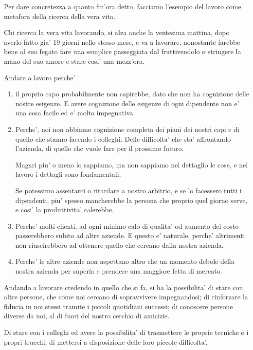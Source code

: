 Per dare concretezza a quanto fin'ora detto, facciamo l'esempio del lavoro come metafora della ricerca della vera vita.

Chi ricerca la vera vita lavorando, si alza anche la ventesima mattina, dopo averlo fatto gia' 19 giorni nello stesso mese, e va a lavorare, nonostante farebbe bene al suo fegato fare una semplice passeggiata dal fruttivendolo o
stringere la mano del suo amore e stare cosi' una mezz'ora.

Andare a lavoro perche' 
\begin{enumerate}
    \item il proprio capo probabilmente non capirebbe, dato che non ha cognizione delle nostre esigenze. E avere cognizione delle esigenze di ogni dipendente non e' una cosa facile ed e' molto impegnativa.
    \item Perche', noi non abbiamo cognizione completa dei piani dei nostri capi e di quello che stanno facendo i colleghi. Delle difficolta' che sta' affrontando l'azienda, di quello che vuole fare per il prossimo futuro.

        Magari piu' o meno lo sappiamo, ma non sappiamo nel dettaglio le cose, e nel lavoro i dettagli sono fondamentali.

        Se potessimo assentarci o ritardare a nostro arbitrio, e se lo facessero tutti i dipendenti, piu' spesso mancherebbe la persona che proprio quel giorno serve, e cosi' la produttivita' calerebbe.
    \item Perche' molti clienti, ad ogni minimo calo di qualita' od aumento del costo passerebbero subito ad altre aziende. E questo e' naturale, perche' altrimenti non riuscirebbero ad ottenere quello che cercano dalla nostra azienda.
    \item Perche' le altre aziende non aspettano altro che un momento debole della nostra azienda per superla e prendere una maggiore fetta di mercato.

\end{enumerate}
Andando a lavorare credendo in quello che si fa, si ha la possibilita' di stare con altre persone, che come noi cercano di sopravvivere impegnandosi; di rinforzare la fiducia in noi stessi tramite i piccoli quotidiani successi; di conoscere persone diverse da noi, al di fuori del nostro cerchio di amicizie.

Di stare con i colleghi ed avere la possibilita' di trasmettere le proprie tecniche e i propri trucchi, di mettersi a disposizione delle loro piccole difficolta'.

